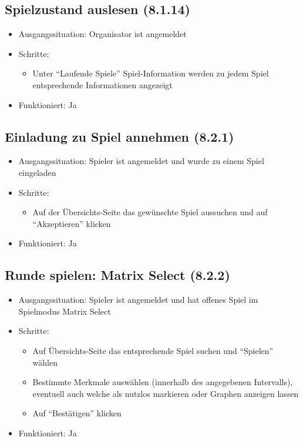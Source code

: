 \documentclass[a4paper]{scrreprt}
\begin{document}
            \subsection{Spielzustand auslesen (8.1.14)}
            \begin{itemize}
                \item Ausgangssituation: Organisator ist angemeldet
                \item Schritte:
                    \begin{itemize}
                        \item Unter \enquote{Laufende Spiele} Spiel-Information werden zu jedem Spiel entsprechende Informationen angezeigt
                    \end{itemize}
                \item Funktioniert: Ja
            \end{itemize}

            \subsection{Einladung zu Spiel annehmen (8.2.1)}
            \begin{itemize}
                \item Ausgangssituation: Spieler ist angemeldet und wurde zu einem Spiel eingeladen
                \item Schritte:
                    \begin{itemize}
                        \item Auf der Übersichts-Seite das gewünschte Spiel aussuchen und auf \enquote{Akzeptieren} klicken
                    \end{itemize}
                \item Funktioniert: Ja
            \end{itemize}

            \subsection{Runde spielen: Matrix Select (8.2.2)}
            \begin{itemize}
                \item Ausgangssituation: Spieler ist angemeldet und hat offenes Spiel im Spielmodus Matrix Select
                \item Schritte:
                    \begin{itemize}
                        \item Auf Übersichts-Seite das entsprechende Spiel suchen und \enquote{Spielen} wählen
                        \item Bestimmte Merkmale auswählen (innerhalb des angegebenen Intervalls), eventuell auch welche als nutzlos markieren oder Graphen anzeigen lassen
                        \item Auf \enquote{Bestätigen} klicken
                    \end{itemize}
                \item Funktioniert: Ja
            \end{itemize}
\end{document}

